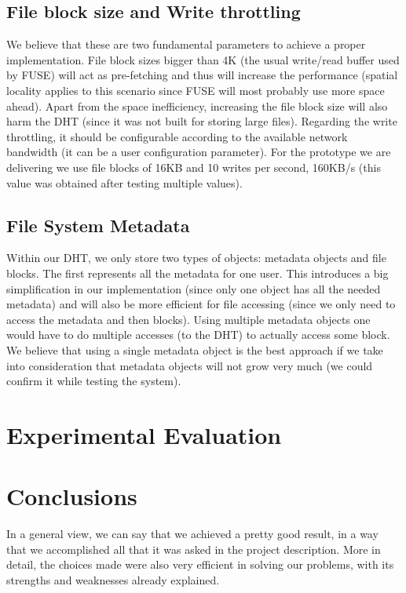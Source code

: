 \documentclass[times,9pt,article]{llncs}
\begin{document}
\subsection{File block size and Write throttling}
We believe that these are two fundamental parameters to achieve a proper implementation. File block sizes bigger than 4K (the usual write/read buffer used by FUSE) will act as pre-fetching and thus will increase the performance (spatial locality applies to this scenario since FUSE will most probably use more space ahead). Apart from the space inefficiency, increasing the file block size will also harm the DHT (since it was not built for storing large files). Regarding the write throttling, it should be configurable according to the available network bandwidth (it can be a user configuration parameter). For the prototype we are delivering we use file blocks of 16KB and 10 writes per second, 160KB/s (this value was obtained after testing multiple values).

\subsection{File System Metadata}
Within our DHT, we only store two types of objects: metadata objects and file blocks. The first represents all the metadata for one user. This introduces a big simplification in our implementation (since only one object has all the needed metadata) and will also be more efficient for file accessing (since we only need to access the metadata and then blocks). Using multiple metadata objects one would have to do multiple accesses (to the DHT) to actually access some block. We believe that using a single metadata object is the best approach if we take into consideration that metadata objects will not grow very much (we could confirm it while testing the system).

\section{Experimental Evaluation}


\section{Conclusions}
In a general view, we can say that we achieved a pretty good result, in a way that we accomplished all that it was asked in the project description.
More in detail, the choices made were also very efficient in solving our problems, with its strengths and weaknesses already explained.
\end{document}
